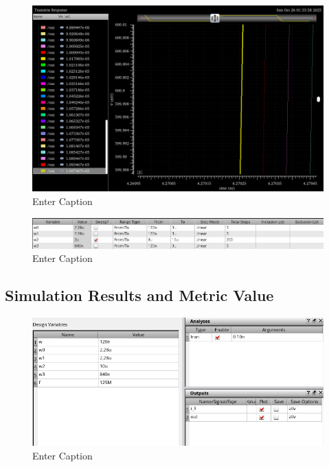 \documentclass[12pt]{article}
\begin{document}
\begin{figure}[H]
    \centering
    \includegraphics[width=0.5\linewidth]{writeup//figures/wmux_1_parametrics_weep.png}
    \caption{Enter Caption}
\end{figure}


\begin{figure}[H]
    \centering
    \includegraphics[width=0.5\linewidth]{writeup//figures/wmux_1_parametric_sweep_setup.png}
    \caption{Enter Caption}
\end{figure}




\newpage

\subsection{Simulation Results and Metric Value}

\begin{figure}[H]
    \centering
    \includegraphics[width=\linewidth]{writeup//figures/optimized_delay_ADEL_setup.png}
    \caption{Enter Caption}
\end{figure}
\end{document}
